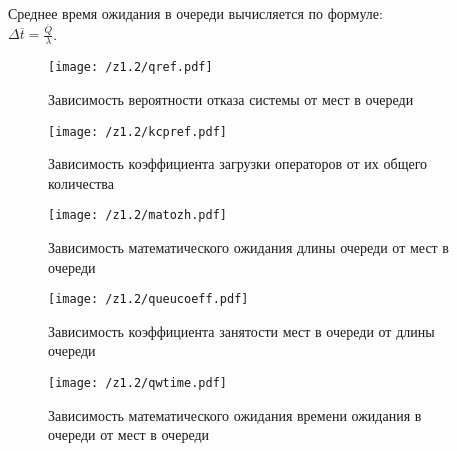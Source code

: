 Среднее время ожидания в очереди вычисляется по формуле: \\$\Delta \overline{t} =  \frac{\overline{Q}}{\lambda}$.  


\begin{figure}[H]
	\begin{center}
        \texttt{[image: /z1.2/qref.pdf]}
        \caption{Зависимость вероятности отказа системы от мест в очереди}
	\end{center}
\end{figure}

\begin{figure}[H]
	\begin{center}
        \texttt{[image: /z1.2/kcpref.pdf]}
        \caption{Зависимость коэффициента загрузки операторов от их общего количества}
	\end{center}
\end{figure}

\begin{figure}[H]
	\begin{center}
        \texttt{[image: /z1.2/matozh.pdf]}
        \caption{Зависимость математического ожидания длины очереди от мест в очереди}
	\end{center}
\end{figure}

\begin{figure}[H]
	\begin{center}
        \texttt{[image: /z1.2/queucoeff.pdf]}
        \caption{Зависимость коэффициента занятости мест в очереди от длины очереди}
	\end{center}
\end{figure}

\begin{figure}[H]
	\begin{center}
        \texttt{[image: /z1.2/qwtime.pdf]}
        \caption{Зависимость математического ожидания времени ожидания в очереди от мест в очереди}
	\end{center}
\end{figure}